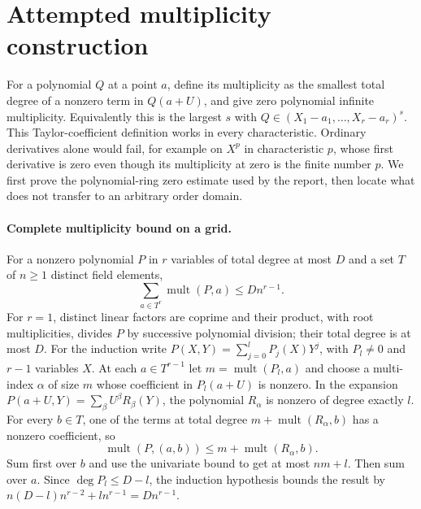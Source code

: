 \documentclass[11pt]{article}
\begin{document}
\section{Attempted multiplicity construction}
For a polynomial $Q$ at a point $a$, define its multiplicity as the smallest
total degree of a nonzero term in $Q(a+U)$, and give zero polynomial infinite
multiplicity. Equivalently this is the largest $s$ with
$Q\in(X_1-a_1,\ldots,X_r-a_r)^s$. This Taylor-coefficient definition works
in every characteristic. Ordinary derivatives alone would fail, for example
on $X^p$ in characteristic $p$, whose first derivative is zero even though
its multiplicity at zero is the finite number $p$.
We first prove the polynomial-ring zero estimate used by the report, then
locate what does not transfer to an arbitrary order domain.

\paragraph{Complete multiplicity bound on a grid.}
For a nonzero polynomial $P$ in $r$ variables of total degree at most $D$
and a set $T$ of $n\ge1$ distinct field elements,
\[
\sum_{a\in T^r}\operatorname{mult}(P,a)\le Dn^{r-1}.
\]
For $r=1$, distinct linear factors are coprime and their product, with
root multiplicities, divides $P$ by successive polynomial division; their
total degree is at most $D$. For the induction write
$P(X,Y)=\sum_{j=0}^lP_j(X)Y^j$, with $P_l\ne0$ and $r-1$ variables $X$.
At each $a\in T^{r-1}$ let $m=\operatorname{mult}(P_l,a)$ and choose
a multi-index $\alpha$ of size $m$ whose coefficient in $P_l(a+U)$ is
nonzero. In the expansion $P(a+U,Y)=\sum_\beta U^\beta R_\beta(Y)$,
the polynomial $R_\alpha$ is nonzero of degree exactly $l$.
For every $b\in T$, one of the terms at total degree
$m+\operatorname{mult}(R_\alpha,b)$ has a nonzero coefficient, so
\[
\operatorname{mult}(P,(a,b))\le
m+\operatorname{mult}(R_\alpha,b).
\]
Sum first over $b$ and use the univariate bound to get at most $nm+l$.
Then sum over $a$. Since $\deg P_l\le D-l$, the induction hypothesis
bounds the result by $n(D-l)n^{r-2}+l n^{r-1}=Dn^{r-1}$.
\end{document}
